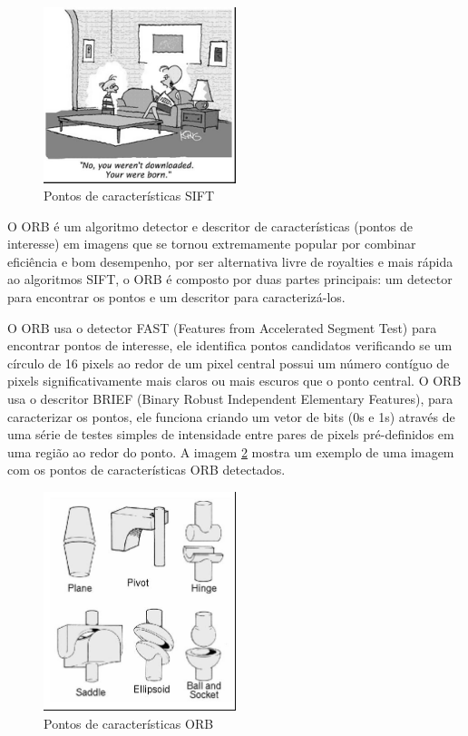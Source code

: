 \documentclass[12pt]{article}
\begin{document}
\begin{figure}[ht]
    \centering
    \includegraphics[width=0.5\textwidth]{sift.jpg}
    \caption{Pontos de características SIFT}
    \label{fig:sift}
\end{figure}

O ORB é um algoritmo detector e descritor de características (pontos de interesse) em imagens que se tornou extremamente popular por combinar eficiência e bom desempenho, por ser alternativa livre de royalties e mais rápida ao algoritmos SIFT, o ORB é composto por duas partes principais: um detector para encontrar os pontos e um descritor para caracterizá-los.

O ORB usa o detector FAST (Features from Accelerated Segment Test) para encontrar pontos de interesse, ele identifica pontos candidatos verificando se um círculo de 16 pixels ao redor de um pixel central possui um número contíguo de pixels significativamente mais claros ou mais escuros que o ponto central. O ORB usa o descritor BRIEF (Binary Robust Independent Elementary Features), para caracterizar os pontos, ele funciona criando um vetor de bits (0s e 1s) através de uma série de testes simples de intensidade entre pares de pixels pré-definidos em uma região ao redor do ponto. A imagem \ref{fig:orb} mostra um exemplo de uma imagem com os pontos de características ORB detectados. 

\begin{figure}[ht]
    \centering
    \includegraphics[width=0.5\textwidth]{orb.jpg}
    \caption{Pontos de características ORB}
    \label{fig:orb}
\end{figure}
\end{document}

